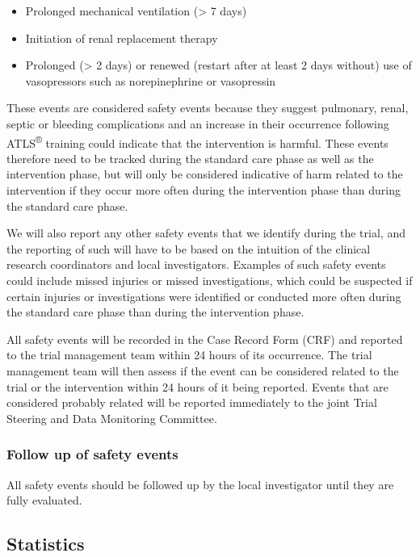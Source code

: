 \documentclass[
]{scrartcl}
\providecommand{\tightlist}{%
  \setlength{\itemsep}{0pt}\setlength{\parskip}{0pt}}\usepackage{longtable,booktabs,array}
\begin{document}
\begin{itemize}
\tightlist
\item
  Prolonged mechanical ventilation (\textgreater{} 7 days)
\item
  Initiation of renal replacement therapy
\item
  Prolonged (\textgreater{} 2 days) or renewed (restart after at least 2
  days without) use of vasopressors such as norepinephrine or
  vasopressin
\end{itemize}

These events are considered safety events because they suggest
pulmonary, renal, septic or bleeding complications and an increase in
their occurrence following ATLS\textsuperscript{®} training could
indicate that the intervention is harmful. These events therefore need
to be tracked during the standard care phase as well as the intervention
phase, but will only be considered indicative of harm related to the
intervention if they occur more often during the intervention phase than
during the standard care phase.

We will also report any other safety events that we identify during the
trial, and the reporting of such will have to be based on the intuition
of the clinical research coordinators and local investigators. Examples
of such safety events could include missed injuries or missed
investigations, which could be suspected if certain injuries or
investigations were identified or conducted more often during the
standard care phase than during the intervention phase.

All safety events will be recorded in the Case Record Form (CRF) and
reported to the trial management team within 24 hours of its occurrence.
The trial management team will then assess if the event can be
considered related to the trial or the intervention within 24 hours of
it being reported. Events that are considered probably related will be
reported immediately to the joint Trial Steering and Data Monitoring
Committee.

\subsubsection{Follow up of safety
events}\label{follow-up-of-safety-events}

All safety events should be followed up by the local investigator until
they are fully evaluated.

\subsection{Statistics}\label{statistics}
\end{document}
